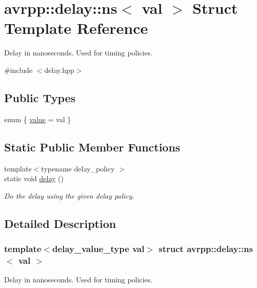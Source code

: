 \hypertarget{structavrpp_1_1delay_1_1ns}{
\section{avrpp::delay::ns$<$ val $>$ Struct Template Reference}
\label{structavrpp_1_1delay_1_1ns}
}


Delay in nanoseconds. Used for timing policies.  




{\ttfamily \#include $<$delay.hpp$>$}

\subsection*{Public Types}
\begin{DoxyCompactItemize}
\item 
enum \{ \hyperlink{structavrpp_1_1delay_1_1ns_a35784fb179c11e81604aedcfe7a511cea590a152f4064b83a568ddbbd1160ef0d}{value} =  val
 \}
\end{DoxyCompactItemize}
\subsection*{Static Public Member Functions}
\begin{DoxyCompactItemize}
\item 
{\footnotesize template$<$typename delay\_\-policy $>$ }\\static void \hyperlink{structavrpp_1_1delay_1_1ns_a5824ae51655e0dea5ca927a9aa6d9ba9}{delay} ()
\begin{DoxyCompactList}\small\item\em Do the delay using the given delay policy. \item\end{DoxyCompactList}\end{DoxyCompactItemize}


\subsection{Detailed Description}
\subsubsection*{template$<$delay\_\-value\_\-type val$>$ struct avrpp::delay::ns$<$ val $>$}

Delay in nanoseconds. Used for timing policies. 


